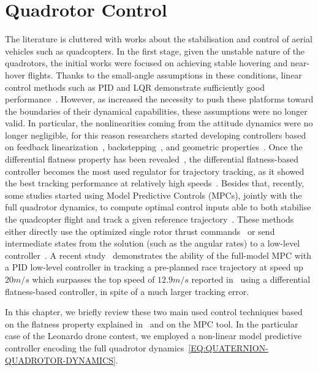 \section{Quadrotor Control}%
\label{SEC:QUADROTOR-CONTROL}
The literature is cluttered with works about the stabilisation and control of aerial vehicles such as quadcopters.
In the first stage, given the unstable nature of the quadrotors, the initial works were focused on achieving stable hovering and
near-hover flights. Thanks to the small-angle assumptions in these conditions, linear control methods such as PID and LQR
demonstrate sufficiently good performance~\cite{khatoon2014pid, dong2013modeling}.
However, as increased the necessity to push these platforms toward the boundaries of their dynamical capabilities, 
these assumptions were no longer valid. In particular, the nonlinearities coming from the attitude dynamics were no longer negligible,
for this reason researchers started developing controllers based on feedback linearization~\cite{voos2009nonlinear},
backstepping~\cite{madani2006backstepping}, and geometric properties~\cite{lee2010geometric}.
Once the differential flatness property has been revealed~\cite{mellinger2011minimum}, the differential flatness-based
controller becomes the most used regulator for trajectory tracking, as it showed the best tracking performance at
relatively high speeds~\cite{faessler2017differential, tal2020accurate}.
Besides that, recently, some studies started using Model Predictive Controls (MPCs), jointly with the full quadrotor dynamics,
to compute optimal control inputs able to both stabilise the quadcopter flight and track a given reference
trajectory~\cite{bicego2020nonlinear, foehn2021time, torrente2021data}.
These methods either directly use the optimized single rotor thrust commands~\cite{bicego2020nonlinear}
or send intermediate states from the solution (such as the angular rates) to a low-level controller~\cite{foehn2021time, torrente2021data}.
A recent study~\cite{foehn2021time} demonstrates the ability of the full-model MPC with a PID low-level controller in tracking a
pre-planned race trajectory at speed up $20 m/s$ which surpasses the top speed of $12.9 m/s$ reported in~\cite{tal2020accurate} using
a differential flatness-based controller, in spite of a much larger tracking error.

In this chapter, we briefly review these two main used control techniques based on the flatness property explained in~
and on the MPC tool. In the particular case of the Leonardo drone contest, we employed a non-linear model predictive controller encoding
the full quadrotor dynamics~\eqref{EQ:QUATERNION-QUADROTOR-DYNAMICS}.  

